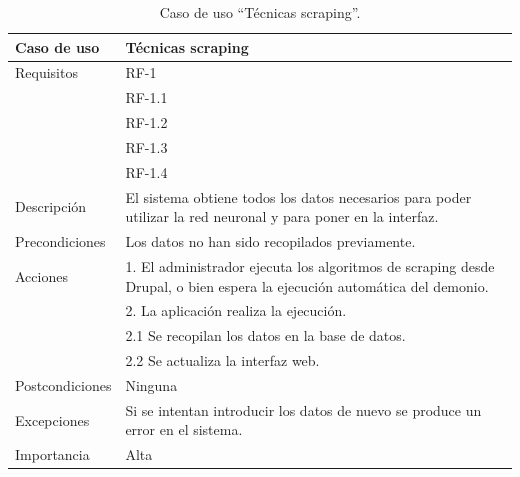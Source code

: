  
\begin{table}
  \begin{center}
   \begin{tabular}{|p{3cm} | p{9cm} |}
    \hline
    Caso de uso & Técnicas scraping\\
    \hline
    Requisitos & RF-1\\
	    & RF-1.1\\
	    & RF-1.2\\
    	& RF-1.3\\
	    & RF-1.4\\
    \hline
    Descripción & El sistema obtiene todos los datos necesarios para poder utilizar la red neuronal y para poner en la interfaz.\\
    \hline
    Precondiciones & Los datos no han sido recopilados previamente.\\
    \hline
    Acciones & 1. El administrador ejecuta los algoritmos de scraping desde Drupal, o bien espera la ejecución automática del demonio. \\
    &2. La aplicación realiza la ejecución. \\
    &\hspace{1em} 2.1 Se recopilan los datos en la base de datos.\\
    &\hspace{1em} 2.2 Se actualiza la interfaz web.\\
    \hline
    Postcondiciones & Ninguna \\
    \hline
    Excepciones & Si se intentan introducir los datos de nuevo se produce un error en el sistema. \\
    \hline
    Importancia & Alta \\
    \hline
   \end{tabular}
   \caption{Caso de uso ``Técnicas scraping''.}
   \label{tabla:casoUso1}
  \end{center}
 \end{table} 
 
